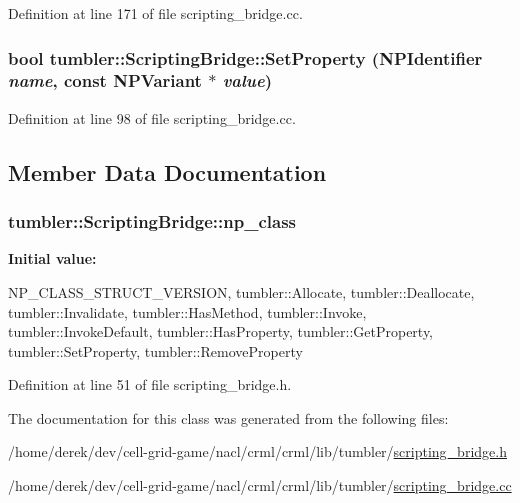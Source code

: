 Definition at line 171 of file scripting\_\-bridge.cc.

\hypertarget{classtumbler_1_1_scripting_bridge_a841486a4fe8e3245dd8d1711e2c72dd3}{
\subsubsection[{SetProperty}]{\setlength{\rightskip}{0pt plus 5cm}bool tumbler::ScriptingBridge::SetProperty ({\bf NPIdentifier} {\em name}, \/  const {\bf NPVariant} $\ast$ {\em value})}}
\label{classtumbler_1_1_scripting_bridge_a841486a4fe8e3245dd8d1711e2c72dd3}


Definition at line 98 of file scripting\_\-bridge.cc.



\subsection{Member Data Documentation}
\hypertarget{classtumbler_1_1_scripting_bridge_a4cd00d35febde2739ee85287f39981ac}{
\subsubsection[{np\_\-class}]{ {\bf tumbler::ScriptingBridge::np\_\-class}}}
\label{classtumbler_1_1_scripting_bridge_a4cd00d35febde2739ee85287f39981ac}
{\bfseries Initial value:}
\begin{DoxyCode}
 {
  NP_CLASS_STRUCT_VERSION,
  tumbler::Allocate,
  tumbler::Deallocate,
  tumbler::Invalidate,
  tumbler::HasMethod,
  tumbler::Invoke,
  tumbler::InvokeDefault,
  tumbler::HasProperty,
  tumbler::GetProperty,
  tumbler::SetProperty,
  tumbler::RemoveProperty
}
\end{DoxyCode}


Definition at line 51 of file scripting\_\-bridge.h.



The documentation for this class was generated from the following files:\begin{DoxyCompactItemize}
\item 
/home/derek/dev/cell-\/grid-\/game/nacl/crml/crml/lib/tumbler/\hyperlink{lib_2tumbler_2scripting__bridge_8h}{scripting\_\-bridge.h}\item 
/home/derek/dev/cell-\/grid-\/game/nacl/crml/crml/lib/tumbler/\hyperlink{lib_2tumbler_2scripting__bridge_8cc}{scripting\_\-bridge.cc}\end{DoxyCompactItemize}
